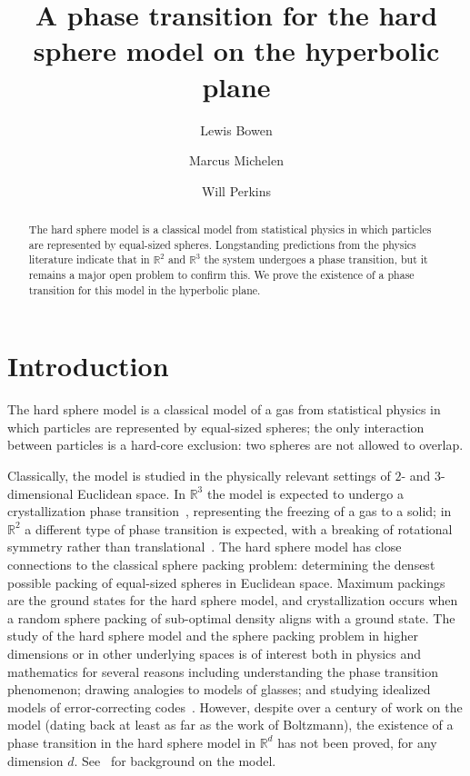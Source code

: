 \documentclass[11pt]{amsart}
\title{A phase transition for the hard sphere model on the hyperbolic plane}
\theoremstyle{definition}
\theoremstyle{remark}
\newcommand{\R}{\mathbb{R}}
\begin{document}
\author{Lewis Bowen}
\address{University of Texas at Austin, Department of Mathematics}

\author{Marcus Michelen}
\address{Northwestern University, Department of Mathematics}

\author{Will Perkins}
\address{Georgia Institute of Technology, School of Computer Science}

\begin{abstract}
    The hard sphere model is a classical model from statistical physics in which particles are represented by equal-sized spheres.  Longstanding predictions from the physics literature indicate that in $\R^2$ and $\R^3$ the system undergoes a phase transition, but it remains a major open problem to confirm this.  We prove the existence of a phase transition for this model in the hyperbolic plane.  
\end{abstract}
\maketitle



\section{Introduction}
\label{secIntro}



The hard sphere model is a classical model of a gas from statistical physics in which particles are represented by equal-sized spheres; the only interaction between particles is a hard-core exclusion: two spheres are not allowed to overlap.  

Classically, the model is studied in the physically relevant settings of $2$- and $3$-dimensional Euclidean space.   In $\R^3$ the model is expected to undergo a crystallization phase transition~\cite{alder1957phase,wood1957preliminary}, representing the freezing of a gas to a solid; in $\R^2$ a different type of phase transition is expected, with a breaking of rotational symmetry rather than translational~\cite{Krauth,richthammer2007translation}.  The hard sphere model has close connections to the classical sphere packing problem: determining the densest possible packing of equal-sized spheres in Euclidean space.  Maximum packings are the ground states for the hard sphere model, and  crystallization occurs when a random sphere packing of sub-optimal density aligns with a ground state. The study of the hard sphere model and the sphere packing problem in higher dimensions or in other underlying spaces is of interest both in physics and mathematics for several reasons including understanding the phase transition phenomenon; drawing analogies to  models of glasses; and studying idealized models of error-correcting codes~\cite{charbonneau2021three,cohn2016sphere,parisi2010mean}. 
However, despite over a century of work on the model (dating back at least as far as the work of Boltzmann), the existence of a phase transition in the hard sphere model in $\R^d$ has not been proved, for any dimension $d$. See~\cite{lowen1994melting,lowen2000fun,mulero2008theory} for background on the model.
\end{document}
